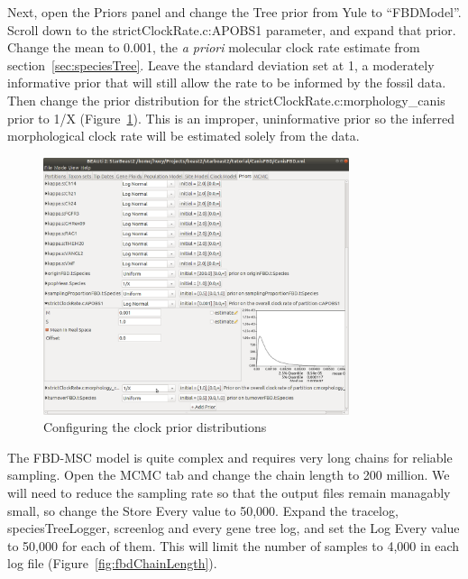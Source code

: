 \documentclass[12pt]{article}
\begin{document}
Next, open the Priors panel and change the Tree prior from Yule to
``FBDModel''. Scroll down to the strictClockRate.c:APOBS1 parameter,
and expand that prior. Change the mean to 0.001, the \textit{a priori}
molecular clock rate estimate from section~\ref{sec:speciesTree}. Leave
the standard deviation set at 1, a moderately informative prior that will
still allow the rate to be informed by the fossil data. Then
change the prior distribution for the strictClockRate.c:morphology\_canis
prior to 1/X (Figure~\ref{fig:clockPriors}). This is an improper,
uninformative prior so the inferred morphological clock rate will be
estimated solely from the data.

\begin{figure}[htb!]
\centering
\includegraphics[width=0.8\textwidth]{figures/clockPriors.png}
\caption
{Configuring the clock prior distributions}
\label{fig:clockPriors}
\end{figure}

The FBD-MSC model is quite complex and requires very long chains for
reliable sampling. Open the MCMC tab and change the chain length to 200
million. We will need to reduce the sampling rate so that the output files remain
managably small, so change the Store Every value to 50,000. Expand the
tracelog, speciesTreeLogger, screenlog and every gene tree log, and set the
Log Every value to 50,000 for each of them. This will limit the number of
samples to 4,000 in each log file (Figure~\ref{fig:fbdChainLength}).
\end{document}
